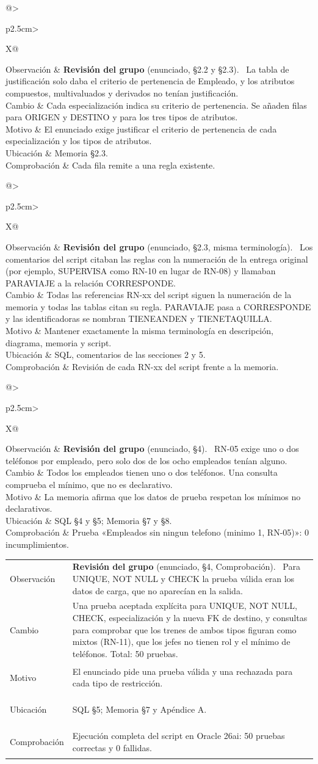 \documentclass[11pt,a4paper]{article}
\makeatletter
\DeclareRobustCommand{\_}{\textunderscore\allowbreak}
\newcommand{\REV}[1]{\textbf{Revisión del grupo} (enunciado, #1).~}
\newcommand{\cambio}[7]{%
\begin{tcolorbox}[colback=white,colframe=azuluvigo,colbacktitle=azuluvigo!8,coltitle=azuluvigo,
  title={\textbf{#1}\quad #2},fonttitle=\normalsize,boxrule=0.6pt,arc=1mm,
  left=2mm,right=2mm,top=1mm,bottom=1mm,before skip=6pt,after skip=6pt]
\small
\begin{tabularx}{\linewidth}{@{}>{\bfseries\raggedright\arraybackslash}p{2.5cm}>{\raggedright\arraybackslash}X@{}}
Observación & #3\\
Cambio & #4\\
Motivo & #5\\
Ubicación & #6\\
Comprobación & #7\\
\end{tabularx}
\end{tcolorbox}}
\makeatother
\begin{document}
\cambio{F-07}{Criterio de pertenencia y justificación de atributos}
{\REV{§2.2 y §2.3} La tabla de justificación solo daba el criterio de pertenencia de Empleado, y los atributos compuestos, multivaluados y derivados no tenían justificación.}
{Cada especialización indica su criterio de pertenencia. Se añaden filas para ORIGEN y DESTINO y para los tres tipos de atributos.}
{El enunciado exige justificar el criterio de pertenencia de cada especialización y los tipos de atributos.}
{Memoria §2.3.}
{Cada fila remite a una regla existente.}

\cambio{F-08}{Comentarios del script}
{\REV{§2.3, misma terminología} Los comentarios del script citaban las reglas con la numeración de la entrega original (por ejemplo, SUPERVISA como RN-10 en lugar de RN-08) y llamaban PARA\_VIAJE a la relación CORRESPONDE.}
{Todas las referencias RN-xx del script siguen la numeración de la memoria y todas las tablas citan su regla. PARA\_VIAJE pasa a CORRESPONDE y las identificadoras se nombran TIENE\_ANDEN y TIENE\_TAQUILLA.}
{Mantener exactamente la misma terminología en descripción, diagrama, memoria y script.}
{SQL, comentarios de las secciones 2 y 5.}
{Revisión de cada RN-xx del script frente a la memoria.}

\cambio{F-09}{Datos de prueba coherentes con las reglas}
{\REV{§4} RN-05 exige uno o dos teléfonos por empleado, pero solo dos de los ocho empleados tenían alguno.}
{Todos los empleados tienen uno o dos teléfonos. Una consulta comprueba el mínimo, que no es declarativo.}
{La memoria afirma que los datos de prueba respetan los mínimos no declarativos.}
{SQL §4 y §5; Memoria §7 y §8.}
{Prueba «Empleados sin ningun telefono (minimo 1, RN-05)»: 0 incumplimientos.}

\cambio{F-10}{Pruebas válidas explícitas y nuevas comprobaciones}
{\REV{§4, Comprobación} Para UNIQUE, NOT NULL y CHECK la prueba válida eran los datos de carga, que no aparecían en la salida.}
{Una prueba aceptada explícita para UNIQUE, NOT NULL, CHECK, especialización y la nueva FK de destino, y consultas para comprobar que los trenes de ambos tipos figuran como mixtos (RN-11), que los jefes no tienen rol y el mínimo de teléfonos. Total: 50 pruebas.}
{El enunciado pide una prueba válida y una rechazada para cada tipo de restricción.}
{SQL §5; Memoria §7 y Apéndice A.}
{Ejecución completa del script en Oracle 26ai: 50 pruebas correctas y 0 fallidas.}
\end{document}
